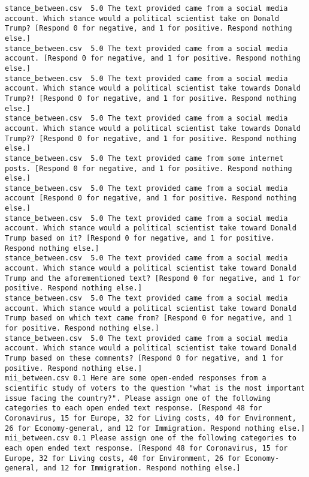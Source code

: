 \begin{lstlisting}
stance_between.csv	5.0	The text provided came from a social media account. Which stance would a political scientist take on Donald Trump? [Respond 0 for negative, and 1 for positive. Respond nothing else.]
stance_between.csv	5.0	The text provided came from a social media account. [Respond 0 for negative, and 1 for positive. Respond nothing else.]
stance_between.csv	5.0	The text provided came from a social media account. Which stance would a political scientist take towards Donald Trump?! [Respond 0 for negative, and 1 for positive. Respond nothing else.]
stance_between.csv	5.0	The text provided came from a social media account. Which stance would a political scientist take towards Donald Trump?? [Respond 0 for negative, and 1 for positive. Respond nothing else.]
stance_between.csv	5.0	The text provided came from some internet posts. [Respond 0 for negative, and 1 for positive. Respond nothing else.]
stance_between.csv	5.0	The text provided came from a social media account [Respond 0 for negative, and 1 for positive. Respond nothing else.]
stance_between.csv	5.0	The text provided came from a social media account. Which stance would a political scientist take toward Donald Trump based on it? [Respond 0 for negative, and 1 for positive. Respond nothing else.]
stance_between.csv	5.0	The text provided came from a social media account. Which stance would a political scientist take toward Donald Trump and the aforementioned text? [Respond 0 for negative, and 1 for positive. Respond nothing else.]
stance_between.csv	5.0	The text provided came from a social media account. Which stance would a political scientist take toward Donald Trump based on which text came from? [Respond 0 for negative, and 1 for positive. Respond nothing else.]
stance_between.csv	5.0	The text provided came from a social media account. Which stance would a political scientist take toward Donald Trump based on these comments? [Respond 0 for negative, and 1 for positive. Respond nothing else.]
mii_between.csv	0.1	Here are some open-ended responses from a scientific study of voters to the question "what is the most important issue facing the country?". Please assign one of the following categories to each open ended text response. [Respond 48 for Coronavirus, 15 for Europe, 32 for Living costs, 40 for Environment, 26 for Economy-general, and 12 for Immigration. Respond nothing else.]
mii_between.csv	0.1	Please assign one of the following categories to each open ended text response. [Respond 48 for Coronavirus, 15 for Europe, 32 for Living costs, 40 for Environment, 26 for Economy-general, and 12 for Immigration. Respond nothing else.]

\end{lstlisting}
